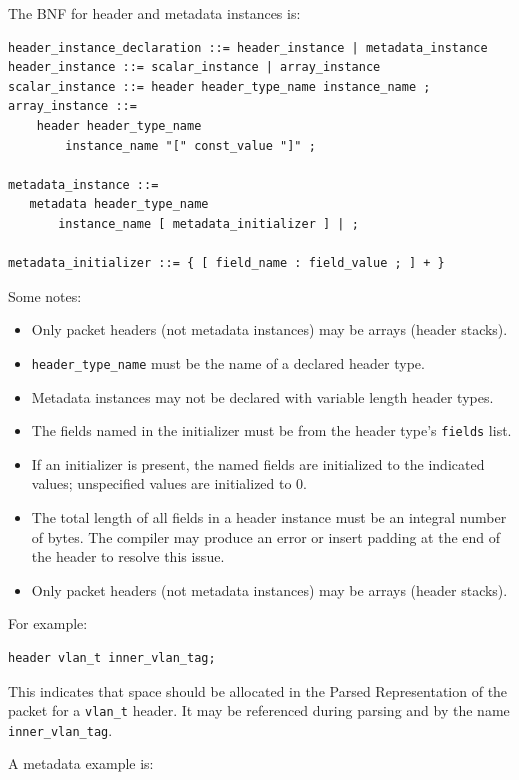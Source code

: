 \documentclass[12pt]{article}
\begin{document}
The BNF for header and metadata instances is:

\begin{lstlisting}[style=BNFstyle]
header_instance_declaration ::= header_instance | metadata_instance
header_instance ::= scalar_instance | array_instance
scalar_instance ::= header header_type_name instance_name ;
array_instance ::=
    header header_type_name 
        instance_name "[" const_value "]" ;

metadata_instance ::= 
   metadata header_type_name
       instance_name [ metadata_initializer ] | ;

metadata_initializer ::= { [ field_name : field_value ; ] + }
\end{lstlisting}


Some notes:

\begin{itemize}
\item
Only packet headers (not metadata instances) may be arrays (header stacks).
\item
\texttt{header_type_name} must be the name of a declared header type.
\item
Metadata instances may not be declared with variable length header types.
\item
The fields named in the initializer must be from the header type's \texttt{fields} list.
\item
If an initializer is present, the named fields are initialized to the indicated 
values; unspecified values are initialized to 0.
\item
The total length of all fields in a header instance must be an integral number
of bytes. The compiler may produce an error or insert padding at the end of
the header to resolve this issue.
\item
Only packet headers (not metadata instances) may be arrays (header stacks).
\end{itemize}


For example:

\begin{lstlisting}[style=P4style]
header vlan_t inner_vlan_tag;
\end{lstlisting}

This indicates that space should be allocated in the Parsed
Representation of the packet for a \texttt{vlan_t} header. It may be
referenced during parsing and \matchaction by the name
\texttt{inner_vlan_tag}.

A metadata example is:
\end{document}
